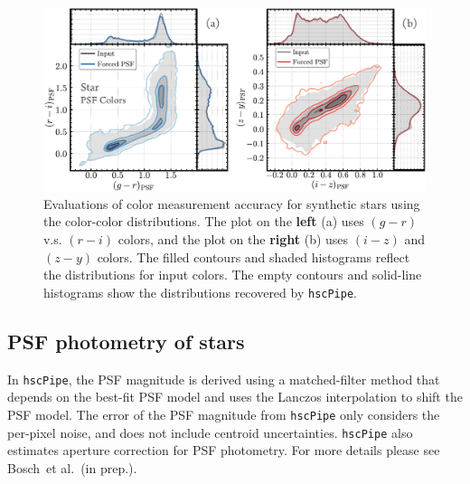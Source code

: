 \documentclass[useamsfonts]{pasj01}
\def\etal{{\ et al.~}}
\def\hscpipe{\texttt{hscPipe}}
\begin{document}
\begin{figure}
    \begin{center}
        \includegraphics[width=\textwidth]{fig/synpipe_psf_cdist}
    \end{center}
    \caption{
        Evaluations of color measurement accuracy for synthetic stars using
        the color-color distributions.
       The plot on the \textbf{left} (a) uses $(g-r)$ v.s. $(r-i)$ colors, and the plot on the \textbf{right} (b)
        uses $(i-z)$ and $(z-y)$ colors.
        The filled contours and shaded histograms reflect the distributions for input
        colors.
        The empty contours and solid-line histograms show the distributions recovered
        by \hscpipe{}.
        }
    \label{fig:psf_cdist}
\end{figure}

\subsection{PSF photometry of stars}
    \label{ssec:psf}

    In \hscpipe{}, the PSF magnitude is derived using a matched-filter method that
    depends on the best-fit PSF model and uses the Lanczos interpolation to shift
    the PSF model.
    The error of the PSF magnitude from \hscpipe{} only considers the per-pixel noise,
    and does not include centroid uncertainties.
    \hscpipe{} also estimates aperture correction for PSF photometry.
    For more details please see Bosch\etal (in prep.).
\end{document}
